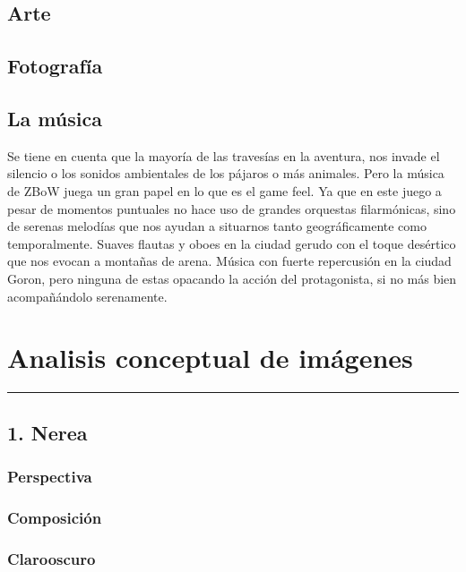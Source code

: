 \documentclass[12pt]{article}
\begin{document}
\subsection{Arte}

\subsection{Fotografía}

\subsection{La música}
Se tiene en cuenta que la mayoría de las travesías en la aventura, nos invade el silencio o los sonidos ambientales de los pájaros o más animales. Pero la música de ZBoW juega un gran papel en lo que es el game feel. Ya que en este juego a pesar de momentos puntuales no hace uso de grandes orquestas filarmónicas, sino de serenas melodías que nos ayudan a situarnos tanto geográficamente como temporalmente. Suaves flautas y oboes en la ciudad gerudo con el toque desértico que nos evocan a montañas de arena. Música con fuerte repercusión en la ciudad Goron, pero ninguna de estas opacando la acción del protagonista, si no más bien acompañándolo serenamente.


\newpage
\section{Analisis conceptual de imágenes}
    \hrule
\vspace{1cm}
    \subsection{1. Nerea}
        \subsubsection{Perspectiva}

        \subsubsection{Composición}

        \subsubsection{Clarooscuro}
\end{document}
